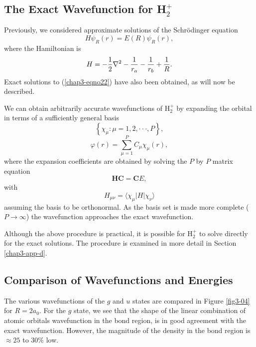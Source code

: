 \subsection{The Exact Wavefunction for H$^+_2$}

Previously, we considered approximate solutions of the Schr\"odinger equation
\begin{equation}
H \psi_R(r) = E ( R ) \psi_R(r) ,
\label{chap3-eqno22}
\end{equation}
where the Hamiltonian is
\begin{equation}
H = - {1 \over 2} \nabla^2 - {1 \over r_a} - {1 \over r_b} + 
{1 \over R} .
\end{equation}
Exact solutions to (\ref{chap3-eqno22}) have also been obtained, as
will now be described.

We can obtain arbitrarily accurate wavefunctions of H$^+_2$ by
expanding the orbital in terms of a sufficiently general basis
\begin{equation}
\left\{ \chi_{\mu} : \mu = 1 , 2 , \cdot \cdot \cdot , P \right\} ,
\end{equation}
\begin{equation}
\varphi ( r ) = \sum^{P}_{\mu = 1} C_{\mu} \chi_{\mu} ( r ) ,
\end{equation}
where the expansion coefficients are obtained by solving the $P$ by 
$P$ matrix equation 
\begin{equation}
\mathbf{HC} = \mathbf{C}E,
\end{equation}
with
\begin{equation}
H_{\mu \nu} = \langle \chi_{\mu} \vert H \vert \chi_{\nu} \rangle
\end{equation}
assuming the basis to be orthonormal.  As the basis set is made more
complete ($P \rightarrow \infty$) the wavefunction approaches the
exact wavefunction.

Although the above procedure is practical, it is possible for H$^+_2$ to solve
directly for the exact solutions. The procedure is examined in more detail in
Section \ref{chap3-app-d}.

\subsection{Comparison of Wavefunctions and Energies}

The various wavefunctions of the $g$ and $u$ states are compared in
Figure \ref{fig3-04} for $R = 2a_0$.  For the $g$ state, we see that
the shape of the linear combination of atomic orbitals wavefunction in
the bond region, is in good agreement with the exact
wavefunction. However, the magnitude of the density in the bond region
is $\approx 25$ to 30\% low.

